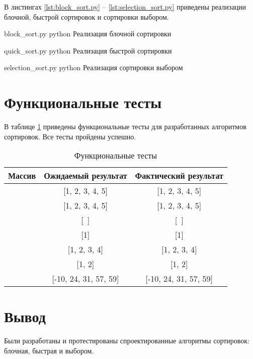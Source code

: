 В листингах \ref{lst:block_sort.py} -- \ref{lst:selection_sort.py} приведены реализации блочной, быстрой сортировок и сортировки выбором.

\clearpage
{}
{block_sort.py} %
{python} %
{Реализация блочной сортировки} %

\clearpage

{quick_sort.py} %
{python} %
{Реализация быстрой сортировки} %

\clearpage

{selection_sort.py} %
{python} %
{Реализация сортировки выбором} %

\clearpage

\section{Функциональные тесты}

В таблице \ref{tbl:func_tests} приведены функциональные тесты для разработанных алгоритмов сортировок. Все тесты пройдены успешно.

\begin{table}[ht]
	\small
	\begin{center}
		\begin{threeparttable}
			\caption{Функциональные тесты}
			\label{tbl:func_tests}
			\begin{tabular}{|c|c|c|}
				\hline
				\bfseries Массив
				& \bfseries Ожидаемый результат
				& \bfseries Фактический результат \\ 
				\hline
				[1, 2, 3, 4, 5] & [1, 2, 3, 4, 5] & [1, 2, 3, 4, 5] \\
				\hline
				[5, 4, 3, 2, 1]  & [1, 2, 3, 4, 5] & [1, 2, 3, 4, 5] \\
				\hline
				[~]  & [~] & [~] \\
				\hline
				[1]  & [1] & [1]\\
				\hline
				[4, 1, 2, 3]  & [1, 2, 3, 4] & [1, 2, 3, 4] \\
				\hline
				[2, 1]  & [1, 2] & [1, 2] \\
				\hline
				[31, 57, 24, -10, 59]  & [-10, 24, 31, 57, 59] & [-10, 24, 31, 57, 59] \\
				\hline
			\end{tabular}	
		\end{threeparttable}	
	\end{center}
\end{table}


\section*{Вывод}
Были разработаны и протестированы спроектированные алгоритмы сортировок: блочная, быстрая и выбором.